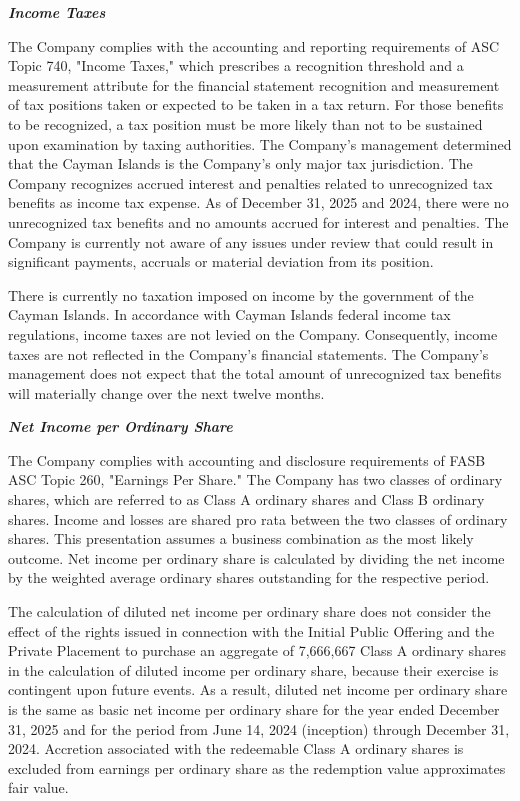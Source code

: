 \documentclass[11pt,a4paper]{article}
\begin{document}
\textit{\textbf{Income Taxes}}

The Company complies with the accounting and reporting requirements of ASC Topic 740, "Income Taxes," which prescribes a recognition threshold and a measurement attribute for the financial statement recognition and measurement of tax positions taken or expected to be taken in a tax return. For those benefits to be recognized, a tax position must be more likely than not to be sustained upon examination by taxing authorities. The Company's management determined that the Cayman Islands is the Company's only major tax jurisdiction. The Company recognizes accrued interest and penalties related to unrecognized tax benefits as income tax expense. As of December 31, 2025 and 2024, there were no unrecognized tax benefits and no amounts accrued for interest and penalties. The Company is currently not aware of any issues under review that could result in significant payments, accruals or material deviation from its position.

There is currently no taxation imposed on income by the government of the Cayman Islands. In accordance with Cayman Islands federal income tax regulations, income taxes are not levied on the Company. Consequently, income taxes are not reflected in the Company's financial statements. The Company's management does not expect that the total amount of unrecognized tax benefits will materially change over the next twelve months.

\textit{\textbf{Net Income per Ordinary Share}}

The Company complies with accounting and disclosure requirements of FASB ASC Topic 260, "Earnings Per Share." The Company has two classes of ordinary shares, which are referred to as Class A ordinary shares and Class B ordinary shares. Income and losses are shared pro rata between the two classes of ordinary shares. This presentation assumes a business combination as the most likely outcome. Net income per ordinary share is calculated by dividing the net income by the weighted average ordinary shares outstanding for the respective period.

The calculation of diluted net income per ordinary share does not consider the effect of the rights issued in connection with the Initial Public Offering and the Private Placement to purchase an aggregate of 7,666,667 Class A ordinary shares in the calculation of diluted income per ordinary share, because their exercise is contingent upon future events. As a result, diluted net income per ordinary share is the same as basic net income per ordinary share for the year ended December 31, 2025 and for the period from June 14, 2024 (inception) through December 31, 2024. Accretion associated with the redeemable Class A ordinary shares is excluded from earnings per ordinary share as the redemption value approximates fair value.
\end{document}
